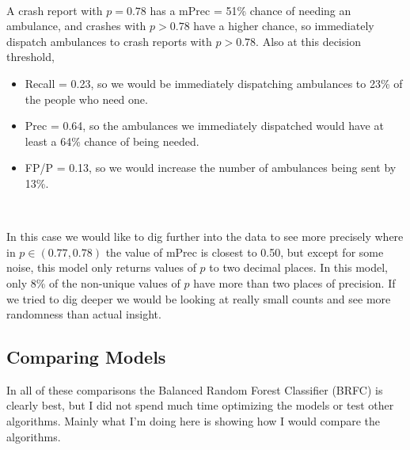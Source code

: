 \begin{enumerate}
	\
	
	A crash report with $p = 0.78$ has a  mPrec = 51\% chance of needing an ambulance, and crashes with $p > 0.78$ have a higher chance, so immediately dispatch ambulances to crash reports with $p > 0.78$.  Also at this decision threshold, 
	
\begin{itemize}
	\item Recall = 0.23, so we would be immediately dispatching ambulances to 23\% of the people who need one.  
	\item Prec = 0.64, so the ambulances we immediately dispatched would have at least a 64\% chance of being needed.  
	\item FP/P = 0.13, so we would increase the number of ambulances being sent by 13\%.  
\end{itemize}

\

In this case we would like to dig further into the data to see more precisely where in $p \in (0.77,0.78)$ the value of mPrec is closest to 0.50, but except for some noise, this model only returns values of $p$ to two decimal places.  In this model, only 8\% of the non-unique values of $p$ have more than two places of precision.  If we tried to dig deeper we would be looking at really small counts and see more randomness than actual insight.  

\end{enumerate}
	
\subsection{Comparing Models}

In all of these comparisons the Balanced Random Forest Classifier (BRFC) is clearly best, but I did not spend much time optimizing the models or test other algorithms.  Mainly what I'm doing here is showing how I would compare the algorithms.  

\


